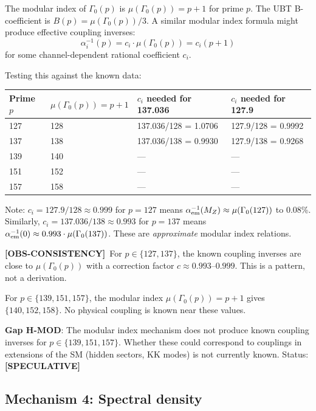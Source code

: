 \documentclass[12pt,a4paper]{article}
\theoremstyle{definition}
\theoremstyle{remark}
\newcommand{\obs}{\textcolor{blue!45!black}{\textbf{[OBS-CONSISTENCY]}}}
\newcommand{\spec}{\textcolor{purple!60!black}{\textbf{[SPECULATIVE]}}}
\begin{document}
The modular index of $\Gamma_0(p)$ is $\mu(\Gamma_0(p)) = p + 1$ for prime
$p$.  The UBT B-coefficient is $B(p) = \mu(\Gamma_0(p))/3$.  A similar
modular index formula might produce effective coupling inverses:
\begin{equation}
  \alpha_i^{-1}(p) = c_i \cdot \mu(\Gamma_0(p)) = c_i(p+1)
  \label{eq:modular_index}
\end{equation}
for some channel-dependent rational coefficient $c_i$.

Testing this against the known data:
\begin{center}
\begin{tabular}{llll}
\toprule
Prime $p$ & $\mu(\Gamma_0(p)) = p+1$ & $c_i$ needed for 137.036 & $c_i$ needed for 127.9 \\
\midrule
127 & 128 & 137.036/128 = 1.0706 & 127.9/128 = 0.9992 \\
137 & 138 & 137.036/138 = 0.9930 & 127.9/138 = 0.9268 \\
139 & 140 & — & — \\
151 & 152 & — & — \\
157 & 158 & — & — \\
\bottomrule
\end{tabular}
\end{center}
Note: $c_i = 127.9/128 \approx 0.999$ for $p = 127$ means
$\alpha_{\rm em}^{-1}(M_Z) \approx \mu(\Gamma_0(127))$ to 0.08\%.
Similarly, $c_i = 137.036/138 \approx 0.993$ for $p = 137$ means
$\alpha_{\rm em}^{-1}(0) \approx 0.993 \cdot \mu(\Gamma_0(137))$.
These are \emph{approximate} modular index relations.

\begin{obsbox}
\obs\ For $p \in \{127, 137\}$, the known coupling inverses are close to
$\mu(\Gamma_0(p))$ with a correction factor $c \approx 0.993$–$0.999$.
This is a pattern, not a derivation.
\end{obsbox}

For $p \in \{139, 151, 157\}$, the modular index $\mu(\Gamma_0(p)) = p+1$
gives $\{140, 152, 158\}$.  No physical coupling is known near these values.

\begin{gapbox}
\textbf{Gap H-MOD}: The modular index mechanism does not produce known coupling
inverses for $p \in \{139, 151, 157\}$.  Whether these could correspond to
couplings in extensions of the SM (hidden sectors, KK modes) is not currently
known.  Status: \spec
\end{gapbox}

\subsection{Mechanism 4: Spectral density}
\end{document}
